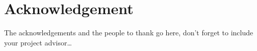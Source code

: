\thispagestyle{empty}
\section*{Acknowledgement}

The acknowledgements and the people to thank go here, don't forget to include your project advisor\ldots



\bigskip{}

\newpage{}\thispagestyle{empty}

\newpage
\thispagestyle{empty}
\mbox{}
\newpage

